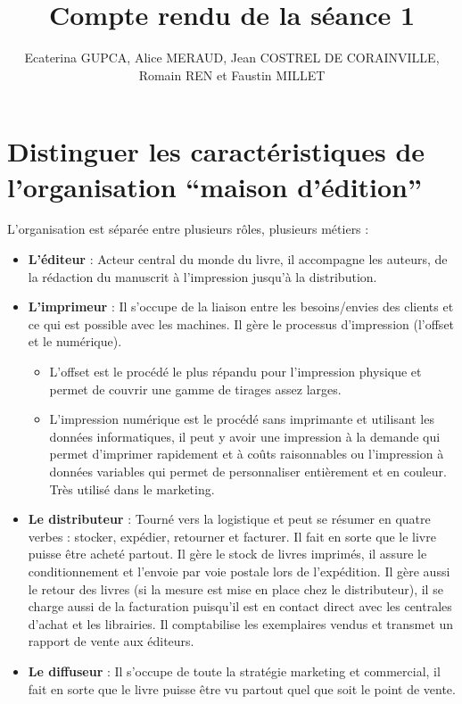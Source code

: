 \documentclass[a4paper, 13pt]{article}
\newcommand{\q}[1]{``#1''}
\begin{document}
\title{Compte rendu de la séance 1}
\author{Ecaterina GUPCA, Alice MERAUD, Jean COSTREL DE CORAINVILLE, Romain REN et Faustin MILLET}
\maketitle

\section{Distinguer les caractéristiques de l'organisation \q{maison d'édition}}
L’organisation est séparée entre plusieurs rôles, plusieurs métiers :
\begin{itemize}
    \item \textbf{L’éditeur} : Acteur central du monde du livre, il accompagne les auteurs, de la rédaction du manuscrit à l’impression jusqu’à la distribution.
    \item \textbf{L’imprimeur} : Il s’occupe de la liaison entre les besoins/envies des clients et ce qui est possible avec les machines. Il gère le processus d’impression (l’offset et le numérique).
    \begin{itemize}
        \item L’offset est le procédé le plus répandu pour l’impression physique et permet de couvrir une gamme de tirages assez larges.
        \item L’impression numérique est le procédé sans imprimante et utilisant les données informatiques, il peut y avoir une impression à la demande qui permet d’imprimer rapidement et à coûts raisonnables ou l’impression à données variables qui permet de personnaliser entièrement et en couleur. Très utilisé dans le marketing.
    \end{itemize}
    \item \textbf{Le distributeur} : Tourné vers la logistique et peut se résumer en quatre verbes : stocker, expédier, retourner et facturer. Il fait en sorte que le livre puisse être acheté partout. Il gère le stock de livres imprimés, il assure le conditionnement et l’envoie par voie postale lors de l’expédition. Il gère aussi le retour des livres (si la mesure est mise en place chez le distributeur), il se charge aussi de la facturation puisqu’il est en contact direct avec les centrales d’achat et les librairies. Il comptabilise les exemplaires vendus et transmet un rapport de vente aux éditeurs.
    \item \textbf{Le diffuseur} : Il s'occupe de toute la stratégie marketing et commercial, il fait en sorte que le livre puisse être vu partout quel que soit le point de vente.

\end{itemize}
\end{document}
